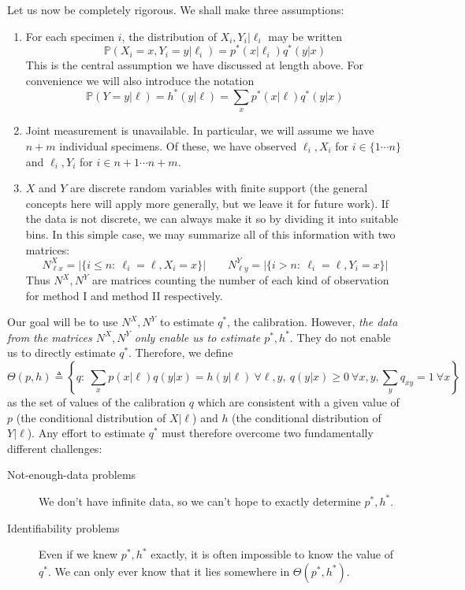 Let us now be completely rigorous.  We shall make three assumptions:

\begin{enumerate}
\item For each specimen $i$, the distribution of $X_i,Y_i|\ell_i$ may be written 
\[
\mathbb{P}(X_i=x,Y_i=y|\ell_i) = p^*(x|\ell_i)q^*(y|x)
\]
This is the central assumption we have discussed at length above.  For convenience we will also introduce the notation
\[
\mathbb{P}(Y=y|\ell) = h^*(y|\ell)=\sum_x p^*(x|\ell) q^*(y|x)
\]
\item Joint measurement is unavailable.  In particular, we will assume we have $n+m$ individual specimens.  Of these, we have observed $\ell_i,X_i$ for $i\in\{1\cdots n\}$ and $\ell_i,Y_i$ for $i\in n+1\cdots n+m$.  
\item $X$ and $Y$ are discrete random variables with finite support (the general concepts here will apply more generally, but we leave it for future work).  If the data is not discrete, we can always make it so by dividing it into suitable bins.  In this simple case, we may summarize all of this information with two matrices:
\[
N^X_{\ell x} = |\{i\leq n:\ \ell_i=\ell,X_i=x\}|  \qquad N^Y_{\ell y} = |\{i>n:\ \ell_i=\ell,Y_i=x\}|
\]
Thus $N^X,N^Y$ are matrices counting the number of each kind of observation for method I and method II respectively. 
\end{enumerate}

Our goal will be to use $N^X,N^Y$ to estimate $q^*$, the calibration.  However, \emph{the data from the matrices $N^X,N^Y$ only enable us to estimate $p^*,h^*$}.  They do not enable us to directly estimate $q^*$.  Therefore, we define
\[
\Theta(p,h) \triangleq  \left\{q:\ \sum_x p(x|\ell)q(y|x) = h(y|\ell)\ \forall \ell,y,\ q(y|x)\geq 0\ \forall x,y, \sum_y q_{xy}=1\ \forall x\right\}
\]
as the set of values of the calibration $q$ which are consistent with a given value of $p$ (the conditional distribution of $X|\ell$) and $h$ (the conditional distribution of $Y|\ell$).  Any effort to estimate $q^*$ must therefore overcome two fundamentally different challenges:

\begin{description}
\item[Not-enough-data problems] We don't have infinite data, so we can't hope to exactly determine $p^*,h^*$.
\item[Identifiability problems] Even if we knew $p^*,h^*$ exactly, it is often impossible to know the value of $q^*$.  We can only ever know that it lies somewhere in $\Theta(p^*,h^*)$.  
\end{description}

